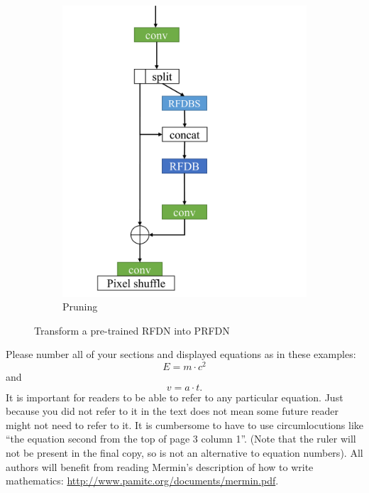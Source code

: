 \documentclass[10pt,twocolumn,letterpaper]{article}
\begin{document}
\begin{figure}
\begin{subfigure}[b]{0.49\linewidth}
        \includegraphics[width=\textwidth]{../Pruning.pdf}
        \caption{Pruning}
        \label{fig:Pruning}
    \end{subfigure}
    \caption{Transform a pre-trained RFDN into PRFDN}
    \label{fig:PRFDN}
\end{figure}

Please number all of your sections and displayed equations as in these examples:
\begin{equation}
  E = m\cdot c^2
  \label{eq:important}
\end{equation}
and
\begin{equation}
  v = a\cdot t.
  \label{eq:also-important}
\end{equation}
It is important for readers to be able to refer to any particular equation.
Just because you did not refer to it in the text does not mean some future reader might not need to refer to it.
It is cumbersome to have to use circumlocutions like ``the equation second from the top of page 3 column 1''.
(Note that the ruler will not be present in the final copy, so is not an alternative to equation numbers).
All authors will benefit from reading Mermin's description of how to write mathematics:
\url{http://www.pamitc.org/documents/mermin.pdf}.
\end{document}
